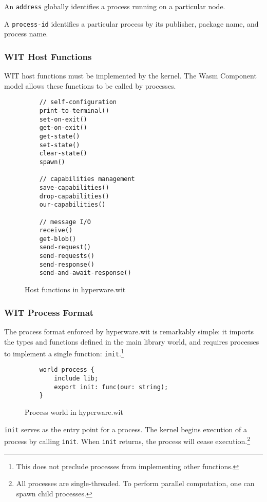 \documentclass[runningheads]{llncs}
\begin{document}
An \verb|address| globally identifies a process running on a particular node.

A \verb|process-id| identifies a particular process by its publisher, package name, and process name.

\subsubsection{WIT Host Functions}
\label{sec:oswitfuncs}

WIT host functions must be implemented by the kernel.
The Wasm Component model allows these functions to be called by processes.

\begin{figure}[H]
    \centering
    \begin{verbatim}
    // self-configuration
    print-to-terminal()
    set-on-exit()
    get-on-exit()
    get-state()
    set-state()
    clear-state()
    spawn()

    // capabilities management
    save-capabilities()
    drop-capabilities()
    our-capabilities()

    // message I/O
    receive()
    get-blob()
    send-request()
    send-requests()
    send-response()
    send-and-await-response()
    \end{verbatim}
    \caption{Host functions in hyperware.wit}
    \label{fig:WIT Functions}
\end{figure}

\subsubsection{WIT Process Format}
\label{sec:oswitprocess}

The process format enforced by hyperware.wit is remarkably simple: it imports the types and functions defined in the main library world, and requires processes to implement a single function: \verb|init|.\footnote{This does not preclude processes from implementing other functions.}

\begin{figure}[H]
    \centering
    \begin{verbatim}
    world process {
        include lib;
        export init: func(our: string);
    }
    \end{verbatim}
    \caption{Process world in hyperware.wit}
    \label{fig:Process world}
\end{figure}

\verb|init| serves as the entry point for a process.
The kernel begins execution of a process by calling \verb|init|.
When \verb|init| returns, the process will cease execution.\footnote{All processes are single-threaded. To perform parallel computation, one can spawn child processes.}
\end{document}
